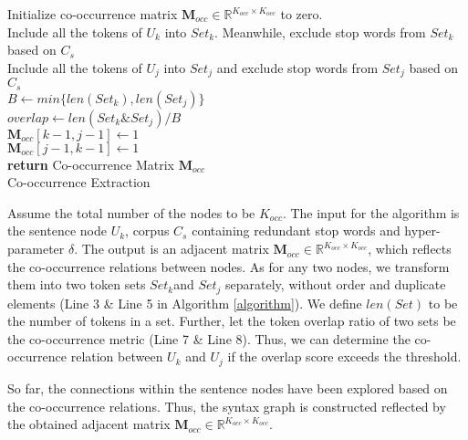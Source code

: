 \documentclass[sigconf]{acmart}
\begin{document}
\begin{algorithm}[t]
	Initialize co-occurrence matrix $\mathbf{M}_{occ} \in \mathbb{R}^{K_{occ} \times K_{occ}} $ to zero.  \\
	{
		Include all the tokens of $U_{k}$ into $Set_{k}$. Meanwhile, exclude stop words from $Set_{k}$ based on $C_{s}$ \\
		{
			Include all the tokens of $U_{j}$ into $Set_{j}$ and exclude stop words from $Set_{j}$ based on $C_{s}$ \\
			{
				$B \leftarrow min\{len(Set_{k}), len(Set_{j})\}$ \\
				$overlap \leftarrow len(Set_{k} \& Set_{j}) / B $ \\
				{
					$\mathbf{M}_{occ}[k-1, j-1] \leftarrow 1$ \\
					$\mathbf{M}_{occ}[j-1, k-1] \leftarrow 1$ \\
				}
			}
		}
	}
	\textbf{return} Co-occurrence Matrix $\mathbf{M}_{occ}$\\
	\caption{Co-occurrence Extraction}
	\label{algorithm}
\end{algorithm}

Assume the total number of the nodes to be $K_{occ}$. The input for the algorithm is the sentence node $U_{k}$, corpus $C_{s}$ containing redundant stop words and hyper-parameter $\delta$. The output is an adjacent matrix $\mathbf{M}_{occ} \in \mathbb{R}^{K_{occ} \times K_{occ}} $, which reflects the co-occurrence relations between nodes. As for any two nodes, we transform them into two token sets $Set_{k}$and $Set_{j}$ separately, without order and duplicate elements (Line 3 \& Line 5 in Algorithm \ref{algorithm}). We define $len(Set)$ to be the number of tokens in a set. Further, let the token overlap ratio of two sets be the co-occurrence metric (Line 7 \& Line 8). Thus, we can determine the co-occurrence relation between $U_{k}$ and $U_{j}$ if the overlap score exceeds the threshold.

So far, the connections within the sentence nodes have been explored based on the co-occurrence relations. Thus, the syntax graph is constructed reflected by the obtained adjacent matrix $\mathbf{M}_{occ} \in \mathbb{R}^{K_{occ} \times K_{occ}}$.
\end{document}
